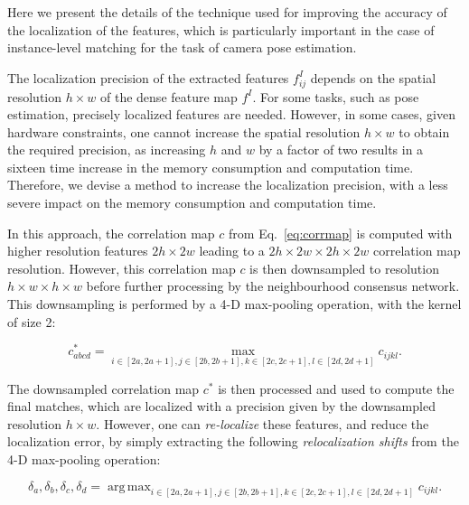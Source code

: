 \documentclass{article}
\DeclareMathOperator*{\argmax}{arg\,max}
\begin{document}
Here we present the details of the technique used for improving the accuracy of the localization of the features, which is particularly important in the case of instance-level matching for the task of camera pose estimation.

The localization precision of the extracted features $f^I_{ij}$ depends on the spatial resolution $h\times w$ of the dense feature map $f^I$. For some tasks, such as pose estimation, precisely localized features are needed. However, in some cases, given hardware constraints, one cannot increase the spatial resolution $h\times w$ to obtain the required precision, as increasing $h$ and $w$ by a factor of two results in a sixteen time increase in the memory consumption and computation time. Therefore, we devise a method to increase the localization precision, with a less severe impact on the memory consumption and computation time.

In this approach, the correlation map $c$ from Eq.~\eqref{eq:corrmap} is computed with higher resolution features $2h
\times 2w$ leading to a $2h \times 2w\times 2h\times 2w$ correlation map resolution. However, this correlation map $c$ is then downsampled to resolution $h\times w\times h\times w$ before further processing by the neighbourhood consensus network. This downsampling is performed by a 4-D max-pooling operation, with the kernel of size 2:

\begin{equation}
    c^{*}_{abcd}=\max_{i\in[2a,2a+1],j\in[2b,2b+1],k\in[2c,2c+1],l\in[2d,2d+1]} c_{ijkl}.
\end{equation}

The downsampled correlation map $c^{*}$ is then processed and used to compute the final matches, which are localized with a precision given by the downsampled resolution $h\times w$.
However, one can \emph{re-localize} these features, and reduce the localization error, by simply extracting the following \emph{relocalization shifts} from the 4-D max-pooling operation:

\begin{equation}
    \delta_a,\delta_b,\delta_c,\delta_d =\argmax_{i\in[2a,2a+1],j\in[2b,2b+1],k\in[2c,2c+1],l\in[2d,2d+1]} c_{ijkl}.
\end{equation}
\end{document}

